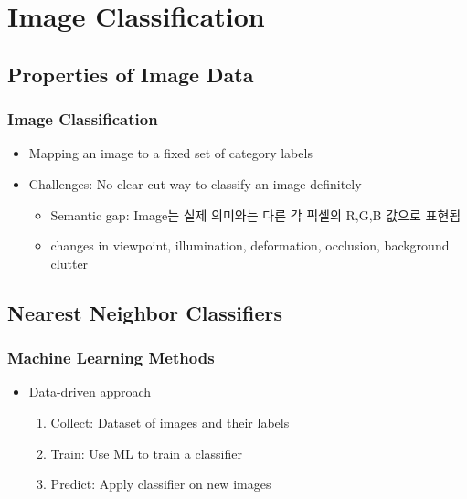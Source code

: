 \section{Image Classification}

\subsection{Properties of Image Data}

\subsubsection*{Image Classification}
\begin{itemize}
    \item Mapping an image to a fixed set of category labels
    \item Challenges: No clear-cut way to classify an image definitely
    \begin{itemize}
        \item Semantic gap: Image는 실제 의미와는 다른 각 픽셀의 R,G,B 값으로 표현됨
        \item changes in viewpoint, illumination, deformation, occlusion, background clutter
    \end{itemize}
\end{itemize}
\begin{figures}
\end{figures}

\subsection{Nearest Neighbor Classifiers}

\subsubsection*{Machine Learning Methods}
\begin{itemize}
    \item Data-driven approach
    \begin{enumerate}
        \item Collect: Dataset of images and their labels
        \item Train: Use ML to train a classifier
        \item Predict: Apply classifier on new images
    \end{enumerate}
\end{itemize}

